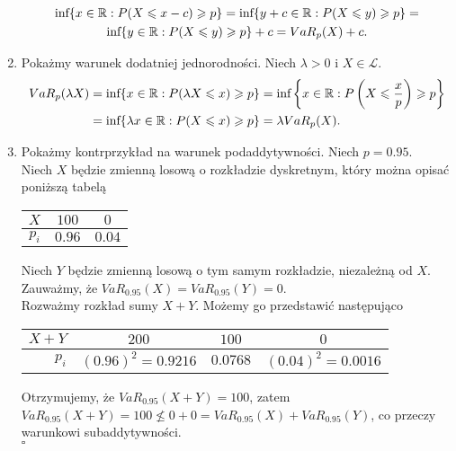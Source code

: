 \documentclass[12pt,a4paper,openany]{book}
\newcommand*{\QEDB}{\hfill\ensuremath{\square}}
\begin{document}
\begin{enumerate}
\begin{gather}
\textnormal{inf} \lbrace x \in \mathbb{R}: P(X \leqslant x - c) \geqslant p \rbrace = \nonumber \textnormal{inf} \lbrace y+c \in \mathbb{R}: P(X \leqslant y) \geqslant p \rbrace = \nonumber \\ \textnormal{inf} \lbrace y \in \mathbb{R}: P(X \leqslant y) \geqslant p \rbrace + c = VaR_{p}(X) + c. \nonumber
\end{gather}
\item
\noindent Pokażmy warunek dodatniej jednorodności. Niech $\lambda > 0$ i $X \in \mathcal{L}$.
\begin{gather}
\begin{split}
VaR_{p}(\lambda X) &= \textnormal{inf} \lbrace x \in \mathbb{R}: P(\lambda X \leqslant x) \geqslant p \rbrace = \textnormal{inf} \left\lbrace x \in \mathbb{R}: P\left(X \leqslant \dfrac{x}{p}\right) \geqslant p \right\rbrace \nonumber \\
&= \textnormal{inf} \lbrace \lambda x \in \mathbb{R}: P(X \leqslant x) \geqslant p \rbrace = \lambda VaR_{p}(X). \nonumber
\end{split}
\end{gather}
\item
\noindent Pokażmy kontrprzykład na warunek podaddytywności. Niech $p = 0.95$.\\
\noindent Niech $X$ będzie zmienną losową o rozkładzie dyskretnym, który można opisać poniższą tabelą

\begin{table}[H]
\begin{center}
\begin{tabular}{r|c|c}
${X}$&$100$& $0$\\ \hline
$p_{i}$ & $0.96$ & $0.04$  \\
\end{tabular}
\end{center}
\end{table}

Niech $Y$ będzie zmienną losową o tym samym rozkładzie, niezależną od $X$.\\ \noindent Zauważmy, że $VaR_{0.95}(X) = VaR_{0.95}(Y) = 0$.\\
\noindent Rozważmy rozkład sumy $X+Y$. Możemy go przedstawić następująco

\begin{table}[H]
\begin{center}
\begin{tabular}{r|c|c|c}
${X+Y}$&$200$& $100$ &$0$\\ \hline
$p_{i}$ & $(0.96)^2 = 0.9216$ & $0.0768$ & $(0.04)^2 = 0.0016$ 
\end{tabular}
\end{center}
\end{table}

\noindent Otrzymujemy, że $VaR_{0.95}(X+Y) = 100$, zatem  $VaR_{0.95}(X+Y) = 100 \nleqslant 0 + 0 = VaR_{0.95}(X) + VaR_{0.95}(Y)$, co przeczy warunkowi subaddytywności.\\
 \phantom{1} \hfill \QEDB


\end{enumerate}
\end{document}
